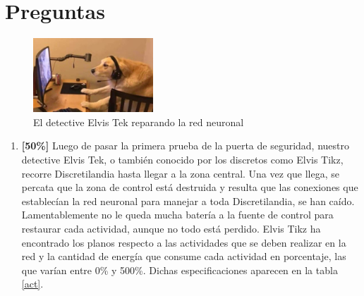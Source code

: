 \documentclass[letterpaper,10pt]{article}
\begin{document}
\section{Preguntas}
\begin{figure}[H]
    \centering
    \includegraphics[width=0.4\textwidth]{Captura8.JPG}
    \caption{El detective Elvis Tek reparando la red neuronal }
    \label{Captura8.JPG}
\end{figure}
\begin{enumerate}
    
    \item \textbf{[50\%]} Luego de pasar la primera prueba de la puerta de seguridad, nuestro detective Elvis Tek, o también conocido por los discretos como Elvis Tikz, recorre Discretilandia hasta llegar a la zona central. Una vez que llega, se percata que la zona de control está destruida y resulta que las conexiones que establecían la red neuronal para manejar a toda Discretilandia, se han caído. Lamentablemente no le queda mucha batería a la fuente de control para restaurar cada actividad, aunque no todo está perdido. Elvis Tikz ha encontrado los planos respecto a las actividades que se deben realizar en la red y la cantidad de energía que consume cada actividad en porcentaje, las que varían entre 0\% y 500\%. Dichas especificaciones aparecen en la tabla \ref{act}.
    

\end{enumerate}
\end{document}
